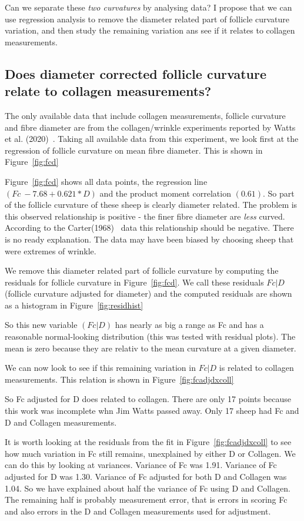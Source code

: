 \documentclass{article}
\begin{document}
Can we separate these {\em two curvatures} by analysing data?  I propose that we can use regression analysis to remove the diameter related part of follicle curvature variation, and then study the remaining variation ans see if it relates to collagen measurements.

\subsection{ Does diameter corrected follicle curvature relate to collagen measurements?}
The only available data that include collagen measurements, follicle curvature and fibre diameter are  from the collagen/wrinkle experiments reported by Watts et al. (2020)~\cite{watts-2020}. Taking all available data from this experiment, we look first at the regression of follicle curvature on mean fibre diameter. This is shown in Figure~\ref{fig:fcd}

Figure~\ref{fig:fcd} shows all data points, the regression line $(Fc ~  -7.68   + 0.621 * D)$ and the product moment correlation $(0.61)$. So part of the follicle curvature of these sheep is clearly diameter related.  The problem is this observed relationship is positive - the finer fibre diameter are {\em less} curved. According to the Carter(1968)~\cite{carter-1968} data this relationship should be negative. There is no ready explanation. The data may have been biased by choosing sheep that were extremes of wrinkle.

We remove this diameter related part of follicle curvature by computing the residuals for follicle curvature in Figure~\ref{fig:fcd}. We call these residuals $Fc | D$ (follicle curvature adjusted for diameter) and the computed residuals are shown as a histogram in Figure~\ref{fig:residhist}

So this new variable $(Fc | D)$ has nearly as big a range as Fc and has a reasonable normal-looking distribution (this was tested with residual plots). The mean is zero because they are relativ to the mean curvature at a given diameter.

We can now look to see if this remaining variation in $Fc | D$ is related to collagen measurements. This relation is shown in Figure~\ref{fig:fcadjdxcoll}

So Fc adjusted for D does related to collagen. There are only 17 points because this work was incomplete whn Jim Watts passed away. Only 17 sheep had Fc and D and Collagen measurements.

It is worth looking at the residuals from the fit in Figure~\ref{fig:fcadjdxcoll} to see how much variation in Fc still remains, unexplained by either D or Collagen.  We can do this by looking at variances. Variance of Fc was 1.91. Variance of Fc adjusted for D was 1.30. Variance of Fc adjusted for both D and Collagen was 1.04. So we have explained about half the variance of Fc using D and Collagen. The remaining half is probably measurement error, that is errors in scoring Fc and also errors in the D and Collagen measurements used for adjustment.
\end{document}
